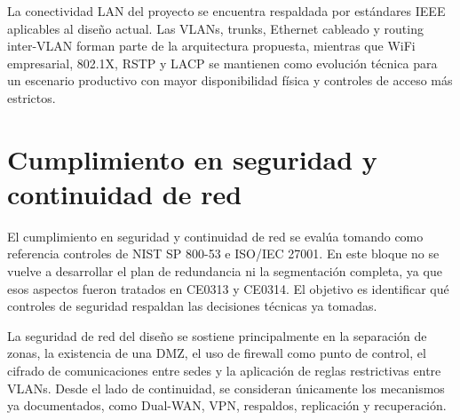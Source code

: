 \documentclass[11pt, a4paper, oneside]{report}
\begin{document}
\normalsize

La conectividad LAN del proyecto se encuentra respaldada por estándares IEEE aplicables al diseño actual. Las VLANs, trunks, Ethernet cableado y routing inter-VLAN forman parte de la arquitectura propuesta, mientras que WiFi empresarial, 802.1X, RSTP y LACP se mantienen como evolución técnica para un escenario productivo con mayor disponibilidad física y controles de acceso más estrictos.

\section{Cumplimiento en seguridad y continuidad de red}

El cumplimiento en seguridad y continuidad de red se evalúa tomando como referencia controles de NIST SP 800-53 e ISO/IEC 27001. En este bloque no se vuelve a desarrollar el plan de redundancia ni la segmentación completa, ya que esos aspectos fueron tratados en CE0313 y CE0314. El objetivo es identificar qué controles de seguridad respaldan las decisiones técnicas ya tomadas.

La seguridad de red del diseño se sostiene principalmente en la separación de zonas, la existencia de una DMZ, el uso de firewall como punto de control, el cifrado de comunicaciones entre sedes y la aplicación de reglas restrictivas entre VLANs. Desde el lado de continuidad, se consideran únicamente los mecanismos ya documentados, como Dual-WAN, VPN, respaldos, replicación y recuperación.

\renewcommand{\arraystretch}{1.3}
\footnotesize
{}
\end{document}
